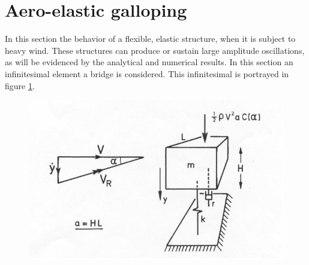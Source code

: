 \section{Aero-elastic galloping}
In this section the behavior of a flexible, elastic structure, when it is subject to heavy wind. These structures can produce or sustain large amplitude oscillations, as will be evidenced by the analytical and numerical results. In this section an infinitesimal element a bridge is considered. This infinitesimal is portrayed in figure \ref{fig:ex2galloping}.
\begin{figure}[htp]
\centering
\includegraphics{img/ex2/galloping.eps}
\caption{}
\label{fig:ex2galloping}
\end{figure}

